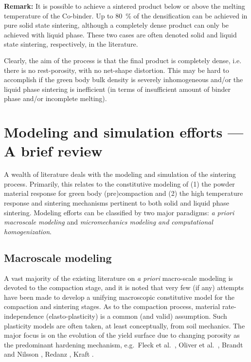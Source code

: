 \documentclass[MikaelDissertation.tex]{subfiles}
\begin{document}
\textbf{Remark:} It is possible to achieve a sintered product below or above the melting temperature of the Co-binder.
Up to \SI{80}{\percent} of the densification can be achieved in pure solid state sintering, although a completely dense product can only be achieved with liquid phase.
These two cases are often denoted solid and liquid state sintering, respectively, in the literature.


Clearly, the aim of the process is that the final product is completely dense, i.e. there is no rest-porosity, with no net-shape distortion.
This may be hard to accomplish if the green body bulk density is severely inhomogeneous and/or the liquid phase sintering is inefficient (in terms of insufficient amount of binder phase and/or incomplete melting).

\section{Modeling and simulation efforts --- A brief review}

A wealth of literature deals with the modeling and simulation of the sintering process.
Primarily, this relates to the constitutive modeling of
(1) the powder material response for green body (pre)compaction and 
(2) the high temperature response and sintering mechanisms pertinent to both solid and liquid phase sintering.
Modeling efforts can be classified by two major paradigms: \emph{a priori macroscale modeling} and \emph{micromechanics modeling and computational homogenization}.

\subsection{Macroscale modeling}

A vast majority of the existing literature on \emph{a priori} macro-scale modeling is devoted to the compaction stage, and it is noted that very few (if any) attempts have been made to develop a unifying macroscopic constitutive model for the compaction and sintering stages.
As to the compaction process, material rate-independence (elasto-plasticity) is a common (and valid) assumption.
Such plasticity models are often taken, at least conceptually, from soil mechanics.
The major focus is on the evolution of the yield surface due to changing porosity as the predominant hardening mechanism, e.g.\ Fleck et al.\ \cite{fleck_yielding_1992},
Oliver et al.\ \cite{oliver_plasticity_1996}, Brandt and Nilsson \cite{brandt_fe-simulation_1998}, Redanz \cite{redanz_numerical_1998}, Kraft \cite{kraft_optimizing_2003}.
\end{document}
